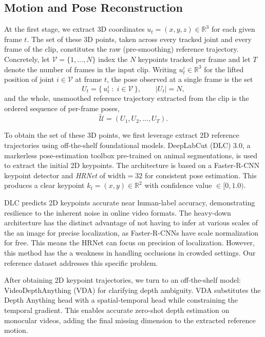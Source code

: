 \documentclass{article}
\theoremstyle{plain}
\theoremstyle{definition}
\theoremstyle{remark}
\begin{document}
\subsection{Motion and Pose Reconstruction}
\label{subsec:pose}

At the first stage, we extract 3D coordinates $u_t = (x, y, z) \in \mathbb{R}^3$ for each given
frame $t$. The set of these 3D points, taken across every tracked joint and every frame of the
clip, constitutes the raw (pre-smoothing) reference trajectory. Concretely, let $\mathcal{V} = \{1, \ldots, N\}$ index the $N$ keypoints tracked per frame and let $T$ denote the number of
frames in the input clip. Writing $u_t^i \in \mathbb{R}^3$ for the lifted position of joint
$i \in \mathcal{V}$ at frame $t$, the pose observed at a single frame is the set
\begin{equation}
    U_t = \{\, u_t^i \;:\; i \in \mathcal{V} \,\}, \qquad |U_t| = N,
\end{equation}
and the whole, unsmoothed reference trajectory extracted from the clip is the ordered sequence of
per-frame poses,
\begin{equation}
    \tilde{\mathcal{U}} = (U_1, U_2, \ldots, U_T).
\end{equation}

To obtain the set of these 3D points, we first leverage extract 2D reference trajectories using off-the-shelf foundational models. DeepLabCut (DLC) 3.0, a markerless pose-estimation toolbox pre-trained on animal segmentations, is used to extract the initial 2D keypoints. The architecture is based on a Faster-R-CNN keypoint detector and \textit{HRNet} of $\text{width} = 32$ for consistent pose estimation. This produces a clear keypoint $k_t = (x, y) \in \mathbb{R}^2$ with confidence value $\in [0, 1.0)$.

DLC predicts 2D keypoints accurate near human-label accuracy, demonstrating resilience to the inherent noise in online video formats. The heavy-down architecture has the distinct advantage of not having to infer at various scales of the an image for precise localization, as Faster-R-CNNs have scale normalization for free. This means the HRNet can focus on precision of localization. However, this method has the a weakness in handling occlusions in crowded settings. Our reference dataset addresses this specific problem.

After obtaining 2D keypoint trajectories, we turn to an off-the-shelf model: VideoDepthAnything (VDA) for clarifying depth ambiguity. VDA substitutes the Depth Anything head with a spatial-temporal head while constraining the temporal gradient. This enables accurate zero-shot depth estimation on monocular videos, adding the final missing dimension to the extracted reference motion. 
\end{document}
